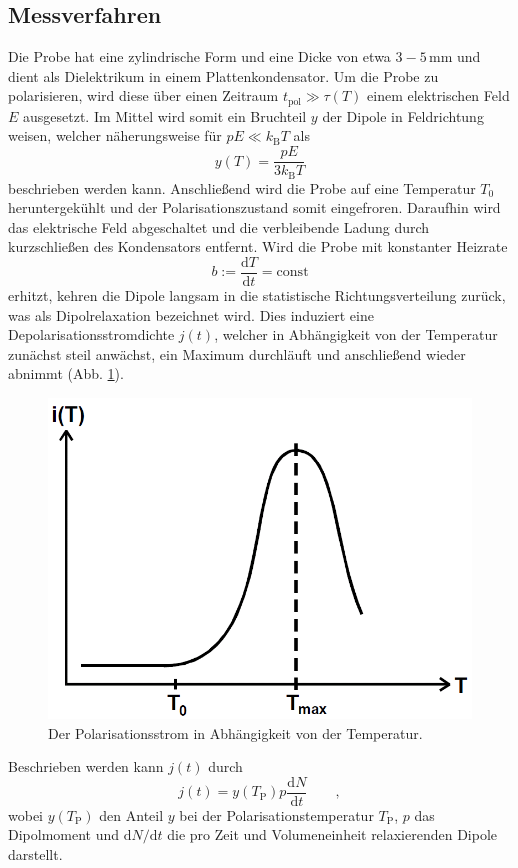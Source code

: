 \subsection{Messverfahren} %
\label{sub:messverfahren}

Die Probe hat eine zylindrische Form und eine Dicke von etwa $3-5\,$mm und dient als Dielektrikum in einem Plattenkondensator.
Um die Probe zu polarisieren, wird diese über einen Zeitraum $t_{\text{pol}} \gg \tau(T)$ einem elektrischen Feld $E$ ausgesetzt.
Im Mittel wird somit ein Bruchteil $y$ der Dipole in Feldrichtung weisen, welcher näherungsweise für $pE \ll k_\text{B} T$ als
\begin{equation}
    y(T) = \frac{p E}{3 k_\text{B} T} \label{y_t}
\end{equation}
beschrieben werden kann.
Anschließend wird die Probe auf eine Temperatur $T_0$ heruntergekühlt und der Polarisationszustand somit eingefroren.
Daraufhin wird das elektrische Feld abgeschaltet und die verbleibende Ladung durch kurzschließen des Kondensators entfernt.
Wird die Probe mit konstanter Heizrate
\begin{equation}
    b := \frac{\mathrm{d}T}{\mathrm{d}t} = \text{const}
\end{equation}
erhitzt, kehren die Dipole langsam in die statistische Richtungsverteilung zurück, was als Dipolrelaxation bezeichnet wird.
Dies induziert eine Depolarisationsstromdichte $j(t)$, welcher in Abhängigkeit von der Temperatur zunächst steil anwächst, ein Maximum durchläuft und anschließend wieder abnimmt (Abb. \ref{fig:pol_strom}).
\begin{figure}
    \centering
    \includegraphics[width = 0.5\linewidth]{data/pol_strom.PNG}
    \caption{Der Polarisationsstrom in Abhängigkeit von der Temperatur.}
    \label{fig:pol_strom}
\end{figure}
Beschrieben werden kann $j(t)$ durch
\begin{equation}
    j(t) = y(T_\mathrm{P}) p \frac{\mathrm{d}N}{\mathrm{d}t} \qquad,
\end{equation}
wobei $y(T_\mathrm{P})$ den Anteil $y$ bei der Polarisationstemperatur $T_\mathrm{P}$, $p$ das Dipolmoment und $\mathrm{d}N/\mathrm{d}t$ die pro Zeit und Volumeneinheit relaxierenden Dipole darstellt.

